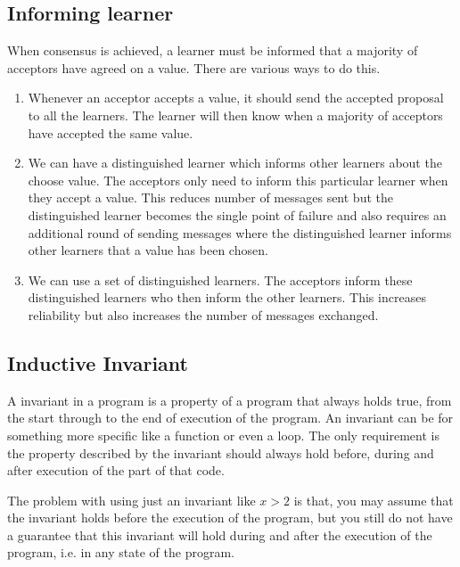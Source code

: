 
\vspace{-4mm}
\subsection{Informing learner}
When consensus is achieved, a learner must be informed that a majority of acceptors
have agreed on a value. There are various ways to do this.

\begin{enumerate}
  \item Whenever an acceptor accepts a value, it should send the accepted proposal
    to all the learners. The learner will then know when a majority of acceptors
    have accepted the same value.
  \item We can have a distinguished learner which informs other learners about
    the choose value. The acceptors only need to inform this particular learner
    when they accept a value. This reduces number of messages sent but the
    distinguished learner becomes the single point of failure and also requires
    an additional round of sending messages where the distinguished learner informs
    other learners that a value has been chosen.
  \item We can use a set of distinguished learners. The acceptors inform these
    distinguished learners who then inform the other learners. This increases
    reliability but also increases the number of messages exchanged.
\end{enumerate}


\subsection{Inductive Invariant}
A invariant in a program is a property of a program that always holds true,
from the start through to the end of execution of the program. An invariant can be for something
more specific like a function or even a loop. The only requirement is the property
described by the invariant should always hold before, during and after execution
of the part of that code.

The problem with using just an invariant like $x > 2$ is that, you may assume
that the invariant holds before the execution of the program, but you still
do not have a guarantee that this invariant will hold during and after the
execution of the program, i.e. in any state of the program.

